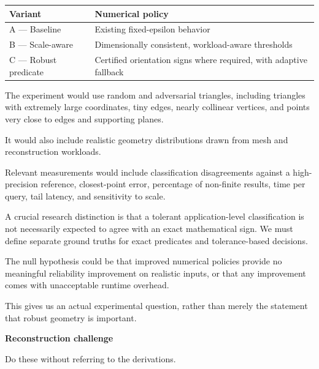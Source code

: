 {\def\LTcaptype{none} %
\begin{longtable}[]{@{}
  >{\raggedright\arraybackslash}p{}
  >{\raggedright\arraybackslash}p{}@{}}
\toprule\noalign{}
\begin{minipage}[b]{\linewidth}\raggedright
Variant
\end{minipage} & \begin{minipage}[b]{\linewidth}\raggedright
Numerical policy
\end{minipage} \\
\midrule\noalign{}
\endhead
\bottomrule\noalign{}
\endlastfoot
A --- Baseline & Existing fixed-epsilon behavior \\
B --- Scale-aware & Dimensionally consistent, workload-aware thresholds \\
C --- Robust predicate & Certified orientation signs where required, with adaptive fallback \\
\end{longtable}
}

The experiment would use random and adversarial triangles, including triangles with extremely large coordinates, tiny edges, nearly collinear vertices, and points very close to edges and supporting planes.

It would also include realistic geometry distributions drawn from mesh and reconstruction workloads.

Relevant measurements would include classification disagreements against a high-precision reference, closest-point error, percentage of non-finite results, time per query, tail latency, and sensitivity to scale.

A crucial research distinction is that a tolerant application-level classification is not necessarily expected to agree with an exact mathematical sign. We must define separate ground truths for exact predicates and tolerance-based decisions.

The null hypothesis could be that improved numerical policies provide no meaningful reliability improvement on realistic inputs, or that any improvement comes with unacceptable runtime overhead.

This gives us an actual experimental question, rather than merely the statement that robust geometry is important.

\textbf{Reconstruction challenge}

Do these without referring to the derivations.

